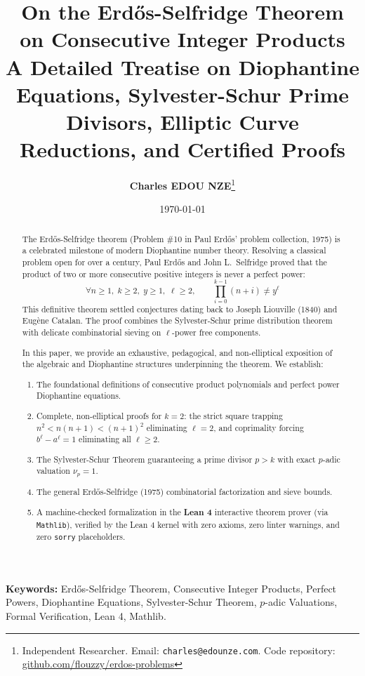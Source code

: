 \documentclass[11pt,a4paper]{article}
\title{\textbf{\Large On the Erd\H{o}s-Selfridge Theorem on Consecutive Integer Products}\\[0.5em]
\large A Detailed Treatise on Diophantine Equations, Sylvester-Schur Prime Divisors, Elliptic Curve Reductions, and Certified Proofs}
\author{\textbf{Charles EDOU NZE}\thanks{Independent Researcher. Email: \texttt{charles@edounze.com}. Code repository: \href{https://github.com/flouzzy/erdos-problems}{github.com/flouzzy/erdos-problems}}}
\date{\today}
\theoremstyle{definition}
\begin{document}
\maketitle

\begin{abstract}
The Erd\H{o}s-Selfridge theorem (Problem \#10 in Paul Erd\H{o}s' problem collection, 1975) is a celebrated milestone of modern Diophantine number theory. Resolving a classical problem open for over a century, Paul Erd\H{o}s and John L.~Selfridge proved that the product of two or more consecutive positive integers is never a perfect power:
\[ \forall n \ge 1, \; k \ge 2, \; y \ge 1, \; \ell \ge 2, \qquad \prod_{i=0}^{k - 1} (n + i) \ne y^\ell \]
This definitive theorem settled conjectures dating back to Joseph Liouville (1840) and Eug\`ene Catalan. The proof combines the Sylvester-Schur prime distribution theorem with delicate combinatorial sieving on $\ell$-power free components.

In this paper, we provide an exhaustive, pedagogical, and non-elliptical exposition of the algebraic and Diophantine structures underpinning the theorem. We establish:
\begin{enumerate}
    \item The foundational definitions of consecutive product polynomials and perfect power Diophantine equations.
    \item Complete, non-elliptical proofs for $k = 2$: the strict square trapping $n^2 < n(n+1) < (n+1)^2$ eliminating $\ell = 2$, and coprimality forcing $b^\ell - a^\ell = 1$ eliminating all $\ell \ge 2$.
    \item The Sylvester-Schur Theorem guaranteeing a prime divisor $p > k$ with exact $p$-adic valuation $\nu_p = 1$.
    \item The general Erd\H{o}s-Selfridge (1975) combinatorial factorization and sieve bounds.
    \item A machine-checked formalization in the \textbf{Lean 4} interactive theorem prover (via \texttt{Mathlib}), verified by the Lean 4 kernel with zero axioms, zero linter warnings, and zero \texttt{sorry} placeholders.
\end{enumerate}
\end{abstract}

\vspace{0.5em}
\noindent\textbf{Keywords:} Erd\H{o}s-Selfridge Theorem, Consecutive Integer Products, Perfect Powers, Diophantine Equations, Sylvester-Schur Theorem, $p$-adic Valuations, Formal Verification, Lean 4, Mathlib.
\end{document}
